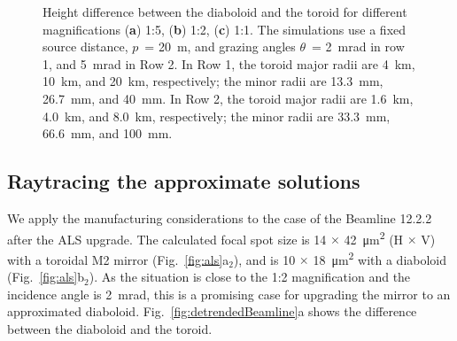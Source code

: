 \documentclass{iucr}       %
\begin{document}
\begin{figure}
\caption{Height difference between the diaboloid and the toroid for different magnifications (\textbf{a}) 1:5, (\textbf{b}) 1:2, (\textbf{c}) 1:1. The simulations use a fixed source distance, $p$~= \SI{20}{\meter}, and grazing angles $\theta$~= \SI{2}{\milli\radian} in row 1, and \SI{5}{\milli\radian} in Row 2. In Row 1, the toroid major radii are \SI{4}{\kilo\meter}, \SI{10}{\kilo\meter}, and \SI{20}{\kilo\meter}, respectively; the minor radii are \SI{13.3}{\milli\meter}, \SI{26.7}{\milli\meter}, and \SI{40}{\milli\meter}. In Row 2, the toroid major radii are \SI{1.6}{\kilo\meter}, \SI{4.0}{\kilo\meter}, and \SI{8.0}{\kilo\meter}, respectively; the minor radii are \SI{33.3}{\milli\meter}, \SI{66.6}{\milli\meter}, and \SI{100}{\milli\meter}.}
\end{figure}

\subsection{Raytracing the approximate solutions}
We apply the manufacturing considerations to the case of the Beamline 12.2.2 after the ALS upgrade. The calculated focal spot size is 14 $\times$ \SI{42}{\micro\meter^2} (H $\times$ V) with a toroidal M2 mirror (Fig.~\ref{fig:als}a$_2$), and is 10 $\times$ \SI{18}{\micro\meter^2} with a diaboloid (Fig.~\ref{fig:als}b$_2$). As the situation is close to the 1:2 magnification and the incidence angle is \SI{2}{\milli\radian}, this is a promising case for upgrading the mirror to an approximated diaboloid. Fig.~\ref{fig:detrendedBeamline}a shows the difference between the diaboloid and the toroid. 
\end{document}
